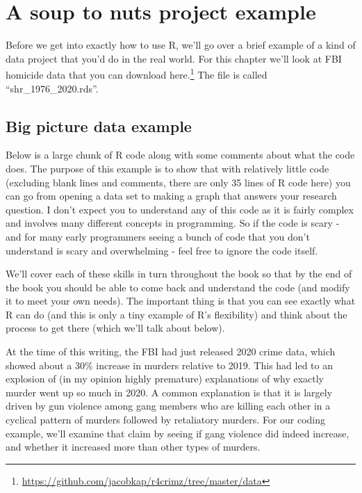 \documentclass[
  a4paper,
]{krantz}
\renewcommand{\href}[2]{#2\footnote{\url{#1}}}
\begin{document}
\hypertarget{a-soup-to-nuts-project-example}{%
\chapter{A soup to nuts project
example}\label{a-soup-to-nuts-project-example}}

Before we get into exactly how to use R, we'll go over a
brief example of a kind of data project that you'd do in the
real world. For this chapter we'll look at FBI homicide data
that you can download
\href{https://github.com/jacobkap/r4crimz/tree/master/data}{here.}
The file is called ``shr\_1976\_2020.rds''.

\hypertarget{big-picture-data-example}{%
\section{Big picture data
example}\label{big-picture-data-example}}

Below is a large chunk of R code along with some comments
about what the code does. The purpose of this example is to
show that with relatively little code (excluding blank lines
and comments, there are only 35 lines of R code here) you
can go from opening a data set to making a graph that
answers your research question. I don't expect you to
understand any of this code as it is fairly complex and
involves many different concepts in programming. So if the
code is scary - and for many early programmers seeing a
bunch of code that you don't understand is scary and
overwhelming - feel free to ignore the code itself.

We'll cover each of these skills in turn throughout the book
so that by the end of the book you should be able to come
back and understand the code (and modify it to meet your own
needs). The important thing is that you can see exactly what
R can do (and this is only a tiny example of R's
flexibility) and think about the process to get there (which
we'll talk about below).

At the time of this writing, the FBI had just released 2020
crime data, which showed about a 30\% increase in murders
relative to 2019. This had led to an explosion of (in my
opinion highly premature) explanations of why exactly murder
went up so much in 2020. A common explanation is that it is
largely driven by gun violence among gang members who are
killing each other in a cyclical pattern of murders followed
by retaliatory murders. For our coding example, we'll
examine that claim by seeing if gang violence did indeed
increase, and whether it increased more than other types of
murders.
\end{document}

